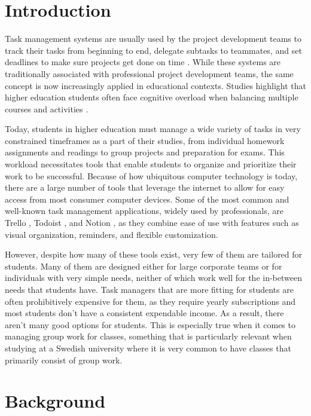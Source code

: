 \documentclass[11pt,oneside]{article}
\begin{document}
\clearpage
\tableofcontents
\clearpage

\section{Introduction}

Task management systems are usually used by the project development teams to track their tasks from beginning to end, delegate subtasks to teammates, and set deadlines to make sure projects get done on time \citep{nurzi2022web}. While these systems are traditionally associated with professional project development teams, the same concept is now increasingly applied in educational contexts. Studies highlight that higher education students often face cognitive overload when balancing multiple courses and activities \citep{kirschner2013learners}. 

Today, students in higher education must manage a wide variety of tasks in very constrained timeframes as a part of their studies, from individual homework assignments and readings to group projects and preparation for exams. This workload necessitates tools that enable students to organize and prioritize their work to be successful. Because of how ubiquitous computer technology is today, there are a large number of tools that leverage the internet to allow for easy access from most consumer computer devices. Some of the most common and well-known task management applications, widely used by professionals, are Trello \citep{shchetynina2022trello}, Todoist \citep{bourbon2021time}, and Notion \citep{reach2022notion}, as they combine ease of use with features such as visual organization, reminders, and flexible customization.

However, despite how many of these tools exist, very few of them are tailored for students. Many of them are designed either for large corporate teams or for individuals with very simple needs, neither of which work well for the in-between needs that students have. Task managers that are more fitting for students are often prohibitively expensive for them, as they require yearly subscriptions and most students don’t have a consistent expendable income. As a result, there aren’t many good options for students. This is especially true when it comes to managing group work for classes, something that is particularly relevant when studying at a Swedish university where it is very common to have classes that primarily consist of group work.

\section{Background}
\label{cha:background}
\end{document}
